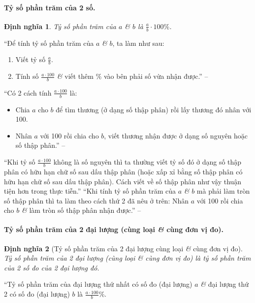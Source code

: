 \documentclass{article}
\numberwithin{equation}{section}
\newtheorem{dinhnghia}{Định nghĩa}[section]
\begin{document}
\paragraph{Tỷ số phần trăm của 2 số.}
\begin{dinhnghia}
	\emph{Tỷ số phần trăm} của $a$ \textit{\&} $b$ là $\frac{a}{b}\cdot 100\%$.
\end{dinhnghia}
``Để tính tỷ số phần trăm của $a$ \textit{\&} $b$, ta làm như sau:
\begin{enumerate}
	\item Viết tỷ số $\frac{a}{b}$.
	\item Tính số $\frac{a\cdot100}{b}$ \textit{\&} viết thêm $\%$ vào bên phải số vừa nhận được.'' -- \cite[p. 63]{SGK_Toan_6_Canh_Dieu_tap_2}
\end{enumerate}
``Có 2 cách tính $\frac{a\cdot 100}{b}$ là:
\begin{itemize}
	\item Chia $a$ cho $b$ để tìm thương (ở dạng số thập phân) rồi lấy thương đó nhân với 100.
	\item Nhân $a$ với 100 rồi chia cho $b$, viết thương nhận được ở dạng số nguyên hoặc số thập phân.'' -- \cite[p. 63]{SGK_Toan_6_Canh_Dieu_tap_2}
\end{itemize}
``Khi tỷ số $\frac{a\cdot 100}{b}$ không là số nguyên thì ta thường viết tỷ số đó ở dạng số thập phân có hữu hạn chữ số sau dấu thập phân (hoặc xấp xỉ bằng số thập phân có hữu hạn chữ số sau dấu thập phân). Cách viết về số thập phân như vậy thuận tiện hơn trong thực tiễn.'' ``Khi tính tỷ số phần trăm của $a$ \textit{\&} $b$ mà phải làm tròn số thập phân thì ta làm theo cách thứ 2 đã nêu ở trên: Nhân $a$ với 100 rồi chia cho $b$ \textit{\&} làm tròn số thập phân nhận được.'' -- \cite[p. 64]{SGK_Toan_6_Canh_Dieu_tap_2}

\paragraph{Tỷ số phần trăm của 2 đại lượng (cùng loại \textit{\&} cùng đơn vị đo).}
\begin{dinhnghia}[Tỷ số phần trăm của 2 đại lượng cùng loại \textit{\&} cùng đơn vị đo]
	 \emph{Tỷ số phần trăm của 2 đại lượng (cùng loại \textit{\&} cùng đơn vị đo)} là tỷ số phần trăm của 2 số đo của 2 đại lượng đó.
\end{dinhnghia}
``Tỷ số phần trăm của đại lượng thứ nhất có số đo (đại lượng) $a$ \textit{\&} đại lượng thứ 2 có số đo (đại lượng) $b$ là $\frac{a\cdot100}{b}\%$.
\end{document}
